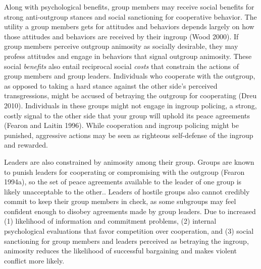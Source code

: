 \documentclass[11pt]{article}
\begin{document}
Along with psychological benefits, group members may receive social
benefits for strong anti-outgroup stances and social sanctioning for
cooperative behavior. The utility a group members gets for attitudes and
behaviors depends largely on how those attitudes and behaviors are
received by their ingroup (Wood 2000). If group members perceive
outgroup animosity as socially desirable, they may profess attitudes and
engage in behaviors that signal outgroup animosity. These social
\emph{benefits} also entail reciprocal social \emph{costs} that
constrain the actions of group members and group leaders. Individuals
who cooperate with the outgroup, as opposed to taking a hard stance
against the other side's perceived transgressions, might be accused of
betraying the outgroup for cooperating (Dreu 2010). Individuals in these
groups might not engage in ingroup policing, a strong, costly signal to
the other side that your group will uphold its peace agreements (Fearon
and Laitin 1996). While cooperation and ingroup policing might be
punished, aggressive actions may be seen as righteous self-defense of
the ingroup and rewarded.

Leaders are also constrained by animosity among their group. Groups are
known to punish leaders for cooperating or compromising with the
outgroup (Fearon 1994a), so the set of peace agreements available to the
leader of one group is likely unacceptable to the other.. Leaders of
hostile groups also cannot credibly commit to keep their group members
in check, as some subgroups may feel confident enough to disobey
agreements made by group leaders. Due to increased (1) likelihood of
information and commitment problems, (2) internal psychological
evaluations that favor competition over cooperation, and (3) social
sanctioning for group members and leaders perceived as betraying the
ingroup, animosity reduces the likelihood of successful bargaining and
makes violent conflict more likely.
\end{document}
